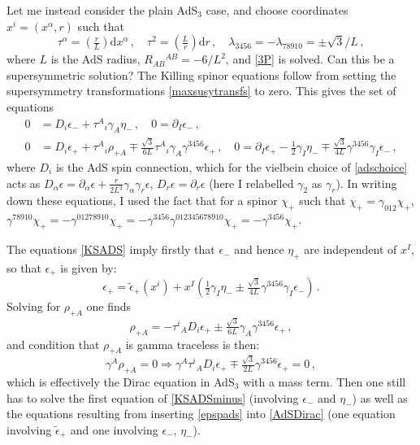 \documentclass[11pt]{article}
\newcommand{\be}{\begin{equation}}
\newcommand{\ee}{\end{equation}}
\newcommand{\dd}{\mathrm{d}}
\newcommand{\Rl}{{R}}
\numberwithin{equation}{section}
\begin{document}
{{Let me instead consider the plain AdS${}_3$ case, and choose coordinates $x^i = (x^\alpha, r)$ such that
\be
\tau^\alpha = \left(\tfrac{r}{L}\right) \dd x^\alpha \,,\quad \tau^2 = \left(\tfrac{L}{r}\right) \dd r \,,\quad
\lambda_{3456} = - \lambda_{78910} = \pm \sqrt{3} / L \,,
\label{adschoice}
\ee
where $L$ is the AdS radius, $\Rl_{AB}{}^{AB} = - 6 / L^2$, and \eqref{3P} is solved.
Can this be a supersymmetric solution? 
The Killing spinor equations follow from setting the supersymmetry transformations \eqref{maxsusytransfs} to zero.
This gives the set of equations
\begin{subequations} 
\label{KSADS}
\begin{align}
0 & = D_i \epsilon_- + \tau^A{}_i \gamma_A \eta_-  \,,\quad
0  = \partial_I \epsilon_-  \,,
\label{KSADSminus}\\[4pt]
0 & = D_i \epsilon_+ +  \tau^A{}_i \rho_{+A}  \mp \tfrac{\sqrt{3}}{6L} \tau^A{}_i \gamma_A \gamma^{3456} \epsilon_+ \,,\quad
0 = \partial_I \epsilon_+ - \tfrac12 \gamma_I \eta_- \mp \tfrac{\sqrt{3}}{4L} \gamma^{3456} \gamma_I \epsilon_- \,,
\label{KSADSplus}
\end{align}
\end{subequations} 
where $D_i$ is the AdS spin connection, which for the vielbein choice of \eqref{adschoice} acts as $D_\alpha \epsilon = \partial_\alpha \epsilon + \tfrac{r}{2L^2} \gamma_\alpha \gamma_r \epsilon$, $D_r \epsilon = \partial_r \epsilon$ (here I relabelled $\gamma_2$ as $\gamma_r$).
In writing down these equations, I used the fact that for a spinor $\chi_+$ such that $\chi_+ = \gamma_{012} \chi_+$, $\gamma^{78910} \chi_+ = - \gamma^{012 789 10} \chi_+ =- \gamma^{3456}\gamma^{012 3456789 10} \chi_+ = - \gamma^{3456} \chi_+$.

The equations \eqref{KSADS} imply firstly that $\epsilon_-$ and hence $\eta_+$ are independent of $x^I$, so that $\epsilon_+$ is given by:
\be
\epsilon_+ = \tilde \epsilon_+(x^i) + x^I \left(
\tfrac12 \gamma_I \eta_-  \pm \tfrac{\sqrt{3}}{4L} \gamma^{3456} \gamma_I \epsilon_- 
\right)  \,.
\label{epspads}
\ee 
Solving for $\rho_{+A}$ one finds
\be
\rho_{+A} = - \tau^i{}_A D_i \epsilon_+ \pm \tfrac{\sqrt{3}}{6L} \gamma_A \gamma^{3456} \epsilon_+ \,,
\ee
and condition that $\rho_{+A}$  is gamma traceless is then:
\be
\gamma^A \rho_{+A} = 0
\Rightarrow  \gamma^A \tau^i{}_A D_i \epsilon_+ \mp \tfrac{\sqrt{3}}{2L}  \gamma^{3456} \epsilon_+ = 0 \,,
\label{AdSDirac}
\ee
which is effectively the Dirac equation in AdS${}_3$ with a mass term.
Then one still has to solve the first equation of \eqref{KSADSminus} (involving $\epsilon_-$ and $\eta_-$) as well as the equations resulting from inserting \eqref{epspads} into \eqref{AdSDirac} (one equation involving $\tilde \epsilon_+$ and one involving $\epsilon_-$, $\eta_-$).

}}
\end{document}
